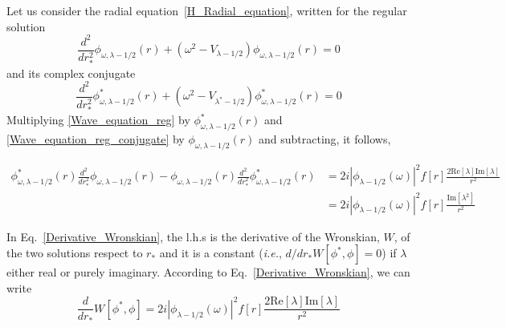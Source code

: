 \documentclass[aps,prd,longbibliography,reprint,twocolumn,amsmath,amssymb,amsfonts,showpacs,footnote,superscriptaddress]{revtex4-1}%
\begin{document}
Let us consider the radial equation~\eqref{H_Radial_equation}, written for the regular solution
\begin{equation}\label{Wave_equation_reg}
   \frac{d^2}{dr_*^2}\phi_{\omega,\lambda-1/2}(r)+\left(\omega^2 -V_{\lambda-1/2}\right) \phi_{\omega,\lambda-1/2}(r) =0
 \end{equation}
and its complex conjugate
 \begin{equation}\label{Wave_equation_reg_conjugate}
   \frac{d^2}{dr_*^2}\phi^*_{\omega,\lambda-1/2}(r)+ \left(\omega^2 -V_{\lambda^*-1/2}\right)\phi^*_{\omega,{\lambda-1/2}}(r) =0
 \end{equation}
Multiplying \eqref{Wave_equation_reg} by $\phi^*_{\omega,\lambda-1/2}(r)$ and \eqref{Wave_equation_reg_conjugate} by $\phi_{\omega,\lambda-1/2}(r)$ and subtracting, it follows,
\begin{widetext}
\begin{equation}\label{Derivative_Wronskian}
\begin{aligned}
 \phi^*_{\omega,\lambda-1/2}(r) \frac{d^2}{dr_*^2}\phi_{\omega,\lambda-1/2}(r) - \phi_{\omega,\lambda-1/2}(r) \frac{d^2}{dr_*^2} \phi^*_{\omega,\lambda-1/2}(r) &= 2 i|\phi_{\lambda-1/2}(\omega)|^2 f[r]\frac{2\text{Re}[\lambda]\text{Im}[\lambda]}{r^2} \\
                           &= 2 i|\phi_{\lambda-1/2}(\omega)|^2 f[r]\frac{\text{Im}[\lambda^2]}{r^2}
 \end{aligned}
\end{equation}
\end{widetext}
In Eq.~\eqref{Derivative_Wronskian}, the l.h.s is the derivative of the Wronskian, $W$, of the two solutions respect to $r_*$ and it is a constant (\textit{i.e.}, $d/dr_* W[\phi^*,\phi] = 0$) if $\lambda$ either real or purely imaginary. According to Eq.~\eqref{Derivative_Wronskian}, we can write
\begin{equation}\label{Derivative_Wronskian_bis}
\frac{d}{dr_*}W[\phi^*,\phi]= 2i|\phi_{\lambda-1/2}(\omega)|^2 f[r]\frac{2\text{Re}[\lambda]\text{Im}[\lambda]}{r^2}
\end{equation}
\end{document}
